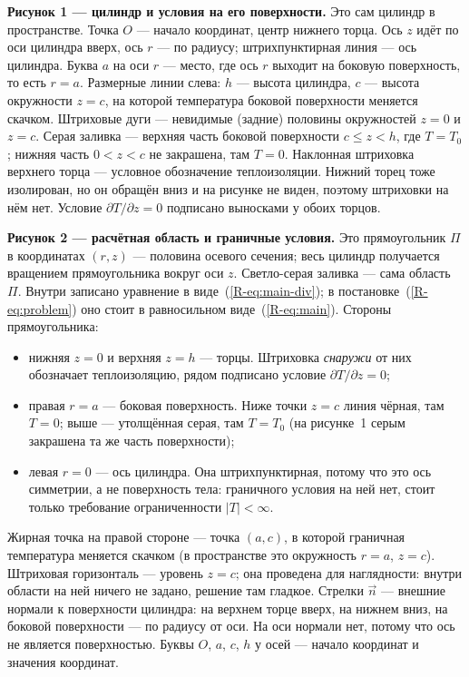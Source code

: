 \documentclass[a4paper,12pt]{article}
\renewcommand{\le}{\leqslant}
\newcommand{\rf}[1]{(\ref*{R-#1})}
\begin{document}
\textbf{Рисунок 1 — цилиндр и условия на его поверхности.} Это сам цилиндр
в пространстве. Точка $O$ — начало координат, центр нижнего торца. Ось $z$
идёт по оси цилиндра вверх, ось $r$ — по радиусу; штрихпунктирная линия —
ось цилиндра. Буква $a$ на оси $r$ — место, где ось $r$ выходит на боковую
поверхность, то есть $r=a$. Размерные линии слева: $h$ — высота цилиндра,
$c$ — высота окружности $z=c$, на которой температура боковой поверхности
меняется скачком. Штриховые дуги — невидимые (задние) половины окружностей
$z=0$ и $z=c$. Серая заливка — верхняя часть боковой поверхности
$c\le z<h$, где $T=T_0$; нижняя часть $0<z<c$ не закрашена, там $T=0$.
Наклонная штриховка верхнего торца — условное обозначение теплоизоляции.
Нижний торец тоже изолирован, но он обращён вниз и на рисунке не виден,
поэтому штриховки на нём нет. Условие $\partial T/\partial z=0$ подписано
выносками у обоих торцов.

\textbf{Рисунок 2 — расчётная область и граничные условия.} Это
прямоугольник $\Pi$ в координатах $(r,z)$ — половина осевого сечения; весь
цилиндр получается вращением прямоугольника вокруг оси $z$. Светло-серая
заливка — сама область $\Pi$. Внутри записано уравнение в
виде~\rf{eq:main-div}; в постановке~\rf{eq:problem} оно стоит в равносильном
виде~\rf{eq:main}. Стороны прямоугольника:
\begin{itemize}
  \item нижняя $z=0$ и верхняя $z=h$ — торцы. Штриховка \emph{снаружи} от
  них обозначает теплоизоляцию, рядом подписано условие
  $\partial T/\partial z=0$;
  \item правая $r=a$ — боковая поверхность. Ниже точки $z=c$ линия чёрная,
  там $T=0$; выше — утолщённая серая, там $T=T_0$ (на рисунке~1 серым
  закрашена та же часть поверхности);
  \item левая $r=0$ — ось цилиндра. Она штрихпунктирная, потому что это ось
  симметрии, а не поверхность тела: граничного условия на ней нет, стоит
  только требование ограниченности $|T|<\infty$.
\end{itemize}
Жирная точка на правой стороне — точка $(a,c)$, в которой граничная
температура меняется скачком (в пространстве это окружность $r=a$, $z=c$).
Штриховая горизонталь — уровень $z=c$; она проведена для наглядности: внутри
области на ней ничего не задано, решение там гладкое. Стрелки $\vec n$ —
внешние нормали к поверхности цилиндра: на верхнем торце вверх, на нижнем
вниз, на боковой поверхности — по радиусу от оси. На оси нормали нет, потому
что ось не является поверхностью. Буквы $O$, $a$, $c$, $h$ у осей — начало
координат и значения координат.
\end{document}
